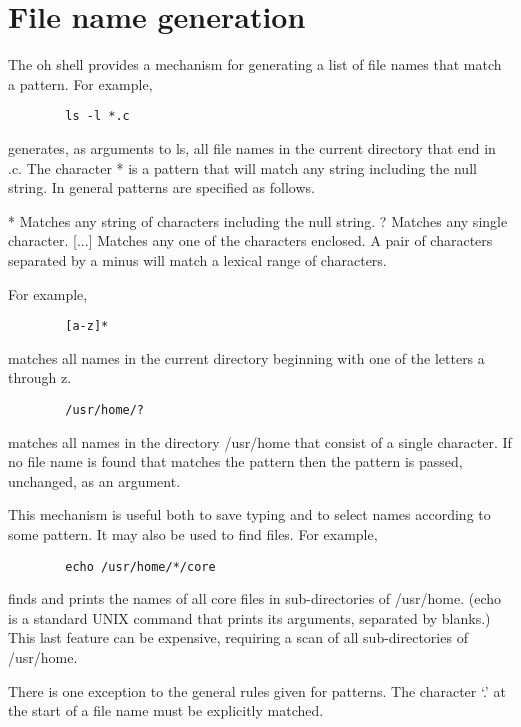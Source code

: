 \documentclass[12pt]{book}
\begin{document}
\section{File name generation}

The oh shell provides a mechanism for generating a list of file
names that match a pattern. For example,

\begin{lstlisting}
    	ls -l *.c
\end{lstlisting}

generates, as arguments to ls, all file names in the current
directory that end in .c. The character * is a pattern that will
match any string including the null string. In general 
patterns are specified as follows.

*	Matches any string of characters including the null string. 
?	Matches any single character. 
[...]	Matches any one of the characters enclosed.
	A pair of characters separated by a minus will match a
        lexical range of characters. 

For example,

\begin{lstlisting}
    	[a-z]*
\end{lstlisting}

matches all names in the current directory beginning with one of
the letters a through z.

\begin{lstlisting}
    	/usr/home/?
\end{lstlisting}

matches all names in the directory /usr/home that consist of a
single character. If no file name is found that matches the pattern
then the pattern is passed, unchanged, as an argument.

This mechanism is useful both to save typing and to select names
according to some pattern. It may also be used to find files. For
example,

\begin{lstlisting}
    	echo /usr/home/*/core
\end{lstlisting}

finds and prints the names of all core files in sub-directories of
/usr/home. (echo is a standard UNIX command that prints its arguments,
separated by blanks.) This last feature can be expensive, requiring
a scan of all sub-directories of /usr/home.

There is one exception to the general rules given for patterns.
The character `.' at the start of a file name must be explicitly
matched.
\end{document}
